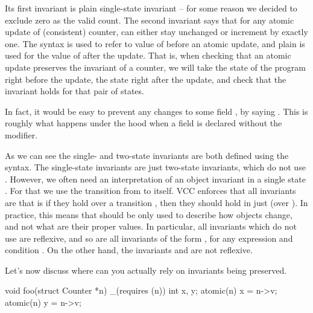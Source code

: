 
\noindent
Its first invariant is plain single-state invariant -- for some reason
we decided to exclude zero as the valid count.
The second invariant says that for any atomic update of (consistent)
counter,  can either stay unchanged or increment by exactly one.
The syntax  is used to refer to value of  before
an atomic update, and plain  is used for the value of 
after the update.
That is, when checking that an atomic update preserves the invariant
of a counter, we will take the state of the program right
before the update, the state right after the update, and check
that the invariant holds for that pair of states.

\begin{note}
In fact, it would be easy to prevent any changes to some field , by
saying .
This is roughly what happens under the hood when a field is
declared without the  modifier.
\end{note}

As we can see the single- and two-state invariants are both defined
using the  syntax.
The single-state invariants are just two-state invariants, which do not use
.
However, we often need an interpretation of an object invariant in a single state .
For that we use the  transition from  to  itself.
VCC enforces that all invariants are  that is if they hold
over a transition , then they should hold in just 
(\ie over ).
In practice,
this means that  should be only used to describe
how objects change, and not what are their proper values.
In particular,
all invariants which do not use  are reflexive, and so
are all invariants of the form , for any expression  and condition .
On the other hand, the invariants  and  are not reflexive.

Let's now discuss where can you actually rely on invariants being preserved.

\begin{VCC}
void foo(struct Counter *n)
  _(requires \wrapped(n))
{
  int x, y;
  atomic(n) { x = n->v; }
  atomic(n) { y = n->v; }
}
\end{VCC}

